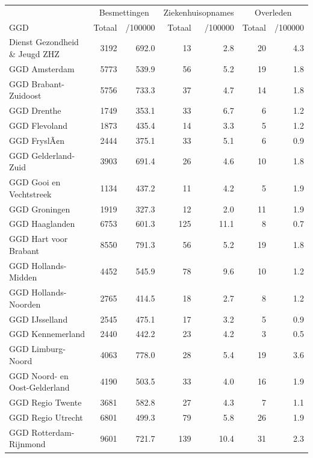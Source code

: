 \documentclass[
  english,
  man,floatsintext]{apa6}
\begin{document}
\begin{table}
\centering\begingroup\fontsize{10}{12}\selectfont

\begin{threeparttable}
\begin{tabular}{lrrrrrr}
\toprule
\multicolumn{1}{c}{ } & \multicolumn{2}{c}{Besmettingen} & \multicolumn{2}{c}{Ziekenhuisopnames} & \multicolumn{2}{c}{Overleden} \\
\cmidrule(l{3pt}r{3pt}){2-3} \cmidrule(l{3pt}r{3pt}){4-5} \cmidrule(l{3pt}r{3pt}){6-7}
GGD & Totaal & /100000 & Totaal & /100000 & Totaal & /100000\\
\midrule
Dienst Gezondheid \& Jeugd ZHZ & 3192 & 692.0 & 13 & 2.8 & 20 & 4.3\\
GGD Amsterdam & 5773 & 539.9 & 56 & 5.2 & 19 & 1.8\\
GGD Brabant-Zuidoost & 5756 & 733.3 & 37 & 4.7 & 14 & 1.8\\
GGD Drenthe & 1749 & 353.1 & 33 & 6.7 & 6 & 1.2\\
GGD Flevoland & 1873 & 435.4 & 14 & 3.3 & 5 & 1.2\\
GGD FryslÃ¢n & 2444 & 375.1 & 33 & 5.1 & 6 & 0.9\\
GGD Gelderland-Zuid & 3903 & 691.4 & 26 & 4.6 & 10 & 1.8\\
GGD Gooi en Vechtstreek & 1134 & 437.2 & 11 & 4.2 & 5 & 1.9\\
GGD Groningen & 1919 & 327.3 & 12 & 2.0 & 11 & 1.9\\
GGD Haaglanden & 6753 & 601.3 & 125 & 11.1 & 8 & 0.7\\
GGD Hart voor Brabant & 8550 & 791.3 & 56 & 5.2 & 19 & 1.8\\
GGD Hollands-Midden & 4452 & 545.9 & 78 & 9.6 & 10 & 1.2\\
GGD Hollands-Noorden & 2765 & 414.5 & 18 & 2.7 & 8 & 1.2\\
GGD IJsselland & 2545 & 475.1 & 17 & 3.2 & 5 & 0.9\\
GGD Kennemerland & 2440 & 442.2 & 23 & 4.2 & 3 & 0.5\\
GGD Limburg-Noord & 4063 & 778.0 & 28 & 5.4 & 19 & 3.6\\
GGD Noord- en Oost-Gelderland & 4190 & 503.5 & 33 & 4.0 & 16 & 1.9\\
GGD Regio Twente & 3681 & 582.8 & 27 & 4.3 & 7 & 1.1\\
GGD Regio Utrecht & 6801 & 499.3 & 79 & 5.8 & 26 & 1.9\\
GGD Rotterdam-Rijnmond & 9601 & 721.7 & 139 & 10.4 & 31 & 2.3\\

\end{tabular}
\end{threeparttable}
\end{table}
\end{document}
